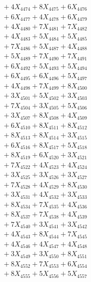 \documentclass[a4paper,10pt]{article}
\begin{document}
{\begin{align}
&\;  + 4 X_{4474} + 8 X_{4475} + 6 X_{4476} \\[0.3ex]
&\;  + 6 X_{4477} + 4 X_{4478} + 6 X_{4479} \\[0.5ex]\allowbreak
&\;  + 4 X_{4480} + 7 X_{4481} + 7 X_{4482} \\[0.3ex]
&\;  + 4 X_{4483} + 5 X_{4484} + 5 X_{4485} \\[0.3ex]
&\;  + 7 X_{4486} + 5 X_{4487} + 4 X_{4488} \\[0.3ex]
&\;  + 5 X_{4489} + 7 X_{4490} + 7 X_{4491} \\[0.3ex]
&\;  + 6 X_{4492} + 5 X_{4493} + 5 X_{4494} \\[0.3ex]
&\;  + 6 X_{4495} + 6 X_{4496} + 5 X_{4497} \\[0.3ex]
&\;  + 4 X_{4498} + 7 X_{4499} + 8 X_{4500} \\[0.3ex]
&\;  + 3 X_{4501} + 5 X_{4502} + 3 X_{4503} \\[0.3ex]
&\;  + 7 X_{4504} + 3 X_{4505} + 5 X_{4506} \\[0.3ex]
&\;  + 3 X_{4507} + 8 X_{4508} + 4 X_{4509} \\[0.5ex]\allowbreak
&\;  + 6 X_{4510} + 8 X_{4511} + 8 X_{4512} \\[0.3ex]
&\;  + 8 X_{4513} + 8 X_{4514} + 3 X_{4515} \\[0.3ex]
&\;  + 6 X_{4516} + 8 X_{4517} + 5 X_{4518} \\[0.3ex]
&\;  + 8 X_{4519} + 6 X_{4520} + 3 X_{4521} \\[0.3ex]
&\;  + 7 X_{4522} + 4 X_{4523} + 4 X_{4524} \\[0.3ex]
&\;  + 3 X_{4525} + 3 X_{4526} + 3 X_{4527} \\[0.3ex]
&\;  + 7 X_{4528} + 4 X_{4529} + 8 X_{4530} \\[0.3ex]
&\;  + 3 X_{4531} + 4 X_{4532} + 3 X_{4533} \\[0.3ex]
&\;  + 8 X_{4534} + 7 X_{4535} + 4 X_{4536} \\[0.3ex]
&\;  + 8 X_{4537} + 7 X_{4538} + 4 X_{4539} \\[0.5ex]\allowbreak
&\;  + 7 X_{4540} + 3 X_{4541} + 3 X_{4542} \\[0.3ex]
&\;  + 4 X_{4543} + 8 X_{4544} + 7 X_{4545} \\[0.3ex]
&\;  + 4 X_{4546} + 4 X_{4547} + 4 X_{4548} \\[0.3ex]
&\;  + 3 X_{4549} + 3 X_{4550} + 8 X_{4551} \\[0.3ex]
&\;  + 8 X_{4552} + 7 X_{4553} + 6 X_{4554} \\[0.3ex]
&\;  + 8 X_{4555} + 5 X_{4556} + 5 X_{4557} \\[0.3ex]

\end{align}}
\end{document}
